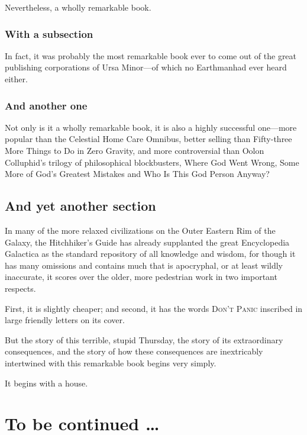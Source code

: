 \documentclass[a4paper, twocolumn, openany]{book}
\begin{document}
	Nevertheless, a wholly remarkable book.
	
	\subsection{With a subsection}
	
	In fact, it was probably the most remarkable book ever to come out of the great publishing corporations of Ursa Minor—of which no Earthmanhad ever heard either.
	
	\subsection{And another one}
	
	Not only is it a wholly remarkable book, it is also a highly successful one—more popular than the Celestial Home Care Omnibus, better selling than Fifty-three More Things to Do in Zero Gravity, and more controversial than Oolon Colluphid’s trilogy of philosophical blockbusters, Where God Went Wrong, Some More of God’s Greatest Mistakes and Who Is This God Person Anyway?
	
	\section{And yet another section}
	
	In many of the more relaxed civilizations on the Outer Eastern Rim of the Galaxy, the Hitchhiker’s Guide has already supplanted the great Encyclopedia Galactica as the standard repository of all knowledge and wisdom, for though it has many omissions and contains much that is apocryphal, or at least wildly inaccurate, it scores over the older, more pedestrian work in two important respects.
	
	First, it is slightly cheaper; and second, it has the words \textsc{Don't Panic} inscribed in large friendly letters on its cover.
	
	But the story of this terrible, stupid Thursday, the story of its extraordinary consequences, and the story of how these consequences are inextricably intertwined with this remarkable book begins very simply.
	
	It begins with a house.
	
	\newpage
	
	\chapter*{To be continued \ldots}
		
\end{document}
